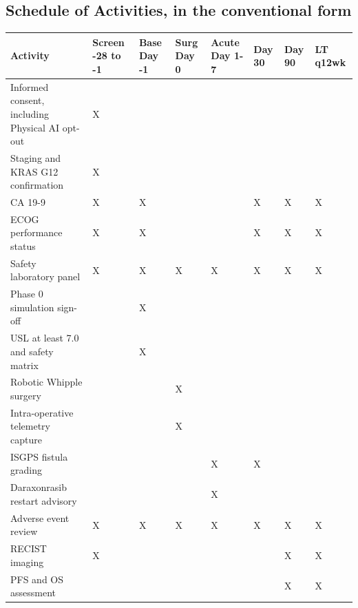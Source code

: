 
\subsection{Schedule of Activities, in the conventional form}


\vspace{0.30em}

\noindent\begin{tabularx}{\textwidth}{L{3.9cm} C{1.55cm} C{1.15cm} C{1.05cm} C{1.35cm} C{0.95cm} C{0.95cm} Y}
\toprule
\textbf{Activity} & \textbf{Screen -28 to -1} & \textbf{Base Day -1} & \textbf{Surg Day 0} & \textbf{Acute Day 1-7} & \textbf{Day 30} & \textbf{Day 90} & \textbf{LT q12wk} \\
\midrule
Informed consent, including Physical AI opt-out & X & & & & & & \\
Staging and KRAS G12 confirmation & X & & & & & & \\
CA 19-9 & X & X & & & X & X & X \\
ECOG performance status & X & X & & & X & X & X \\
Safety laboratory panel & X & X & X & X & X & X & X \\
Phase 0 simulation sign-off & & X & & & & & \\
USL at least 7.0 and safety matrix & & X & & & & & \\
Robotic Whipple surgery & & & X & & & & \\
Intra-operative telemetry capture & & & X & & & & \\
ISGPS fistula grading & & & & X & X & & \\
Daraxonrasib restart advisory & & & & X & & & \\
Adverse event review & X & X & X & X & X & X & X \\
RECIST imaging & X & & & & & X & X \\
PFS and OS assessment & & & & & & X & X \\
\bottomrule
\end{tabularx}

